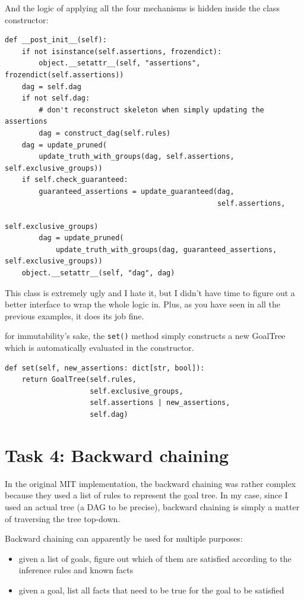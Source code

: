 \documentclass[11pt]{article}
\begin{document}
And the logic of applying all the four mechanisms is hidden inside the class constructor:
\begin{verbatim}
def __post_init__(self):
    if not isinstance(self.assertions, frozendict):
        object.__setattr__(self, "assertions", frozendict(self.assertions))
    dag = self.dag
    if not self.dag:
        # don't reconstruct skeleton when simply updating the assertions
        dag = construct_dag(self.rules)
    dag = update_pruned(
        update_truth_with_groups(dag, self.assertions, self.exclusive_groups))
    if self.check_guaranteed:
        guaranteed_assertions = update_guaranteed(dag,
                                                  self.assertions,
                                                  self.exclusive_groups)
        dag = update_pruned(
            update_truth_with_groups(dag, guaranteed_assertions, self.exclusive_groups))
    object.__setattr__(self, "dag", dag)
\end{verbatim}

This class is extremely ugly and I hate it,
but I didn't have time to figure out a better interface to wrap the whole logic in.
Plus, as you have seen in all the previous examples, it does its job fine.

for immutability's sake, the \texttt{set()} method simply constructs a new GoalTree which is
automatically evaluated in the constructor.
\begin{verbatim}
def set(self, new_assertions: dict[str, bool]):
    return GoalTree(self.rules,
                    self.exclusive_groups,
                    self.assertions | new_assertions,
                    self.dag)
\end{verbatim}

\section{Task 4: Backward chaining}
\label{sec:org590df81}

In the original MIT implementation, the backward chaining was rather complex
because they used a list of rules to represent the goal tree.
In my case, since I used an actual tree (a DAG to be precise),
backward chaining is simply a matter of traversing the tree top-down.

Backward chaining can apparently be used for multiple purposes:
\begin{itemize}
\item given a list of goals, figure out which of them are satisfied according to the inference rules and known facts
\item given a goal, list all facts that need to be true for the goal to be satisfied
\end{itemize}
\end{document}
